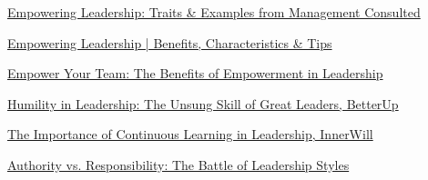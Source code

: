 \documentclass[runningheads]{llncs}
\begin{document}
\begin{thebibliography}{10}
\href{https://managementconsulted.com/empowering-leadership/#:~:text=Here%20are%20some%20empowering%20leadership,They%20are%20effective%20communicators}{Empowering Leadership: Traits \& Examples from Management Consulted}

\href{https://www.leapsome.com/blog/empowering-leadership#:~:text=Empowering%20leadership%20is%20the%20practice,fits%20into%20the%20big%20picture}{Empowering Leadership | Benefits, Characteristics \& Tips}

\href{https://maven.com/articles/empowerment-in-leadership#:~:text=1,2}{Empower Your Team: The Benefits of Empowerment in Leadership}

\href{https://www.betterup.com/blog/humility-in-leadership}{Humility in Leadership: The Unsung Skill of Great Leaders, BetterUp}

\href{https://innerwill.org/continuous-learning-in-leadership/#:~:text=Our%20clients%20compete%20in%20various,very%20much%20their%20competitive%20advantage}{The Importance of Continuous Learning in Leadership, InnerWill}


\href{https://joshuamevans.com/authority-vs-responsibility-the-battle-of-leadership-styles/}{Authority vs. Responsibility: The Battle of Leadership Styles}





\end{thebibliography}
\end{document}

